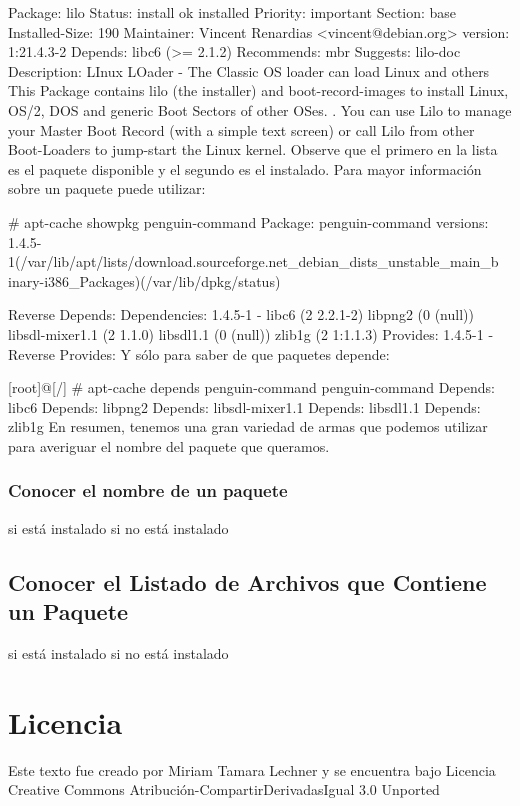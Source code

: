 \documentclass[12pt]{article}
\begin{document}
     Package: lilo
     Status: install ok installed
     Priority: important
     Section: base
     Installed-Size: 190
     Maintainer: Vincent Renardias <vincent@debian.org>
     version: 1:21.4.3-2
     Depends: libc6 (>= 2.1.2)
     Recommends: mbr
     Suggests: lilo-doc
     Description: LInux LOader - The Classic OS loader can load Linux and others
      This Package contains lilo (the installer) and boot-record-images to
      install Linux, OS/2, DOS and generic Boot Sectors of other OSes.
      .
      You can use Lilo to manage your Master Boot Record (with a simple text screen)
      or call Lilo from other Boot-Loaders to jump-start the Linux kernel.
Observe que el primero en la lista es el paquete disponible y el segundo es el instalado. Para mayor información sobre un paquete puede utilizar:

     # apt-cache showpkg penguin-command
     Package: penguin-command
     versions:
     1.4.5-1(/var/lib/apt/lists/download.sourceforge.net_debian_dists_unstable_main_b
     inary-i386_Packages)(/var/lib/dpkg/status)
     
     Reverse Depends:
     Dependencies:
     1.4.5-1 - libc6 (2 2.2.1-2) libpng2 (0 (null)) libsdl-mixer1.1 (2 1.1.0)
      libsdl1.1 (0 (null)) zlib1g (2 1:1.1.3)
     Provides:
     1.4.5-1 -
     Reverse Provides:
Y sólo para saber de que paquetes depende:

     [root]@[/] # apt-cache depends penguin-command
     penguin-command
       Depends: libc6
       Depends: libpng2
       Depends: libsdl-mixer1.1
       Depends: libsdl1.1
       Depends: zlib1g
En resumen, tenemos una gran variedad de armas que podemos utilizar para averiguar el nombre del paquete que queramos.




\subsubsection*{Conocer el nombre de un paquete}
	si está instalado
	si no está instalado
\subsection*{Conocer el Listado de Archivos que Contiene un Paquete}
	si está instalado
	si no está instalado





\section*{Licencia}

Este texto fue creado por Miriam Tamara Lechner y se encuentra bajo 
Licencia Creative Commons Atribución-CompartirDerivadasIgual 3.0 Unported
\end{document}
